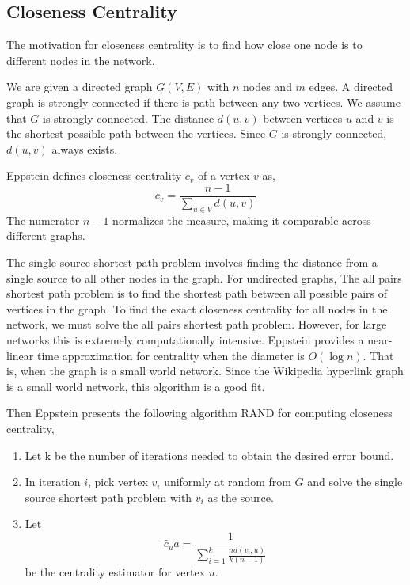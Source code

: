 \documentclass{article}
\begin{document}
\subsection{Closeness Centrality}


The motivation for closeness centrality is to find how close one node is to different nodes in the network.


We are given a directed graph $G(V,E)$ with $n$ nodes and $m$ edges.
A directed graph is strongly connected if there is path between any two vertices. We assume that $G$ is strongly connected.
The distance $d(u, v)$ between vertices $u$ and $v$ is the shortest possible path between the vertices. Since $G$ is strongly connected, $d(u, v)$ always exists.


Eppstein defines closeness centrality $c_v$ of a vertex $v$ as,
\begin{equation*}
    c_v = \frac{n-1}{\sum_{u \in V}d(u,v)}
\end{equation*} 
The numerator $n-1$ normalizes the measure, making it comparable across different graphs.


The single source shortest path problem involves finding the distance from a single source to all other nodes in the graph. For undirected graphs, 
The all pairs shortest path problem is to find the shortest path between all possible pairs of vertices in the graph.
To find the exact closeness centrality for all nodes in the network, we must solve the all pairs shortest path problem. However, for large networks this is extremely computationally intensive. 
Eppstein provides a near-linear time approximation for centrality when the diameter is $O(\log n)$. That is, when the graph is a small world network. Since the Wikipedia hyperlink graph is a small world network, this algorithm is a good fit.

Then Eppstein presents the following algorithm RAND for computing closeness centrality,
\begin{enumerate}[1.]
    \item 
    Let k be the number of iterations needed to obtain the desired error bound.

    \item
    In iteration $i$, pick vertex $v_i$ uniformly at random from $G$ and solve the single source shortest path problem with $v_i$ as the source.

    \item 
    Let
    \begin{equation*}
        \hat{c}_ua = \frac{1}{\sum^k_{i=1} \frac{n d(v_i, u)}{k(n-1)}}
    \end{equation*}
    be the centrality estimator for vertex $u$.
\end{enumerate}
\end{document}

